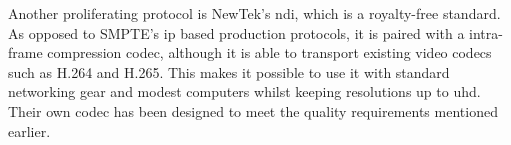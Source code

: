 \documentclass[../main.tex]{subfiles}
\begin{document}
Another proliferating protocol is NewTek's \gls{ndi}, which is a royalty-free standard. As opposed to SMPTE's \gls{ip} based production protocols, it is paired with a intra-frame compression codec, although it is able to transport existing video codecs such as H.264 and H.265. This makes it possible to use it with standard networking gear and modest computers whilst keeping resolutions up to \gls{uhd}. Their own codec has been designed to meet the quality requirements mentioned earlier.\newline

\printbibliography
\end{document}

